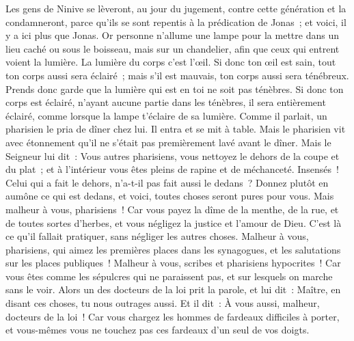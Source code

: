 \begin{multicols}{2}
Les gens de Ninive se lèveront, au jour du jugement, contre cette génération et la condamneront, parce qu'ils se sont repentis à la prédication de Jonas~; et voici, il y a ici plus que Jonas.
Or personne n'allume une lampe pour la mettre dans un lieu caché ou sous le boisseau, mais sur un chandelier, afin que ceux qui entrent voient la lumière.
La lumière du corps c'est l'œil. Si donc ton œil est sain, tout ton corps aussi sera éclairé~; mais s'il est mauvais, ton corps aussi sera ténébreux.
Prends donc garde que la lumière qui est en toi ne soit pas ténèbres.
Si donc ton corps est éclairé, n'ayant aucune partie dans les ténèbres, il sera entièrement éclairé, comme lorsque la lampe t'éclaire de sa lumière.
Comme il parlait, un pharisien le pria de dîner chez lui. Il entra et se mit à table.
Mais le pharisien vit avec étonnement qu'il ne s'était pas premièrement lavé avant le dîner.
Mais le Seigneur lui dit~: Vous autres pharisiens, vous nettoyez le dehors de la coupe et du plat~; et à l'intérieur vous êtes pleins de rapine et de méchanceté.
Insensés~! Celui qui a fait le dehors, n'a-t-il pas fait aussi le dedans~?
Donnez plutôt en aumône ce qui est dedans, et voici, toutes choses seront pures pour vous.
Mais malheur à vous, pharisiens~! Car vous payez la dîme de la menthe, de la rue, et de toutes sortes d'herbes, et vous négligez la justice et l'amour de Dieu. C'est là ce qu'il fallait pratiquer, sans négliger les autres choses.
Malheur à vous, pharisiens, qui aimez les premières places dans les synagogues, et les salutations sur les places publiques~!
Malheur à vous, scribes et pharisiens hypocrites~! Car vous êtes comme les sépulcres qui ne paraissent pas, et sur lesquels on marche sans le voir.
Alors un des docteurs de la loi prit la parole, et lui dit~: Maître, en disant ces choses, tu nous outrages aussi.
Et il dit~: À vous aussi, malheur, docteurs de la loi~! Car vous chargez les hommes de fardeaux difficiles à porter, et vous-mêmes vous ne touchez pas ces fardeaux d'un seul de vos doigts.

\end{multicols}
